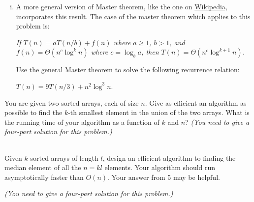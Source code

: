 \begin{qunlist}
\begin{enumerate}[(a)]
\begin{enumerate}[(i)]
\item A more general version of Master theorem, like the one on \href{https://en.wikipedia.org/wiki/Master_theorem}{Wikipedia}, incorporates this result. The case of the master theorem which applies to this problem is:

\textit{If $T(n) = aT(n/b) + f(n)$ where $a \geq 1$, $b > 1$, and $f(n) = \Theta(n^c \log^k n)$ where $c = \log_b a$, then $T(n) = \Theta(n^c \log^{k+1} n)$. }

Use the general Master theorem to solve the following recurrence relation:

$T(n) = 9T(n/3) + n^2 \log ^3 n$.
\end{enumerate} 
\end{enumerate}

\answer{}


You are given two sorted arrays, each of size $n$. Give as efficient an algorithm as possible to find the $k$-th smallest element in the union of the two arrays. What is the running time of your algorithm as a function of $k$ and $n$?
{\em (You need to give a four-part solution for this problem.)}

\answer{}


 \\
Given $k$ sorted arrays of length $l$, design an efficient algorithm to finding the median element of all the $n=kl$ elements. Your algorithm should run  asymptotically faster than $O(n)$. Your answer from 5 may be helpful.

{\em (You need to give a four-part solution for this problem.)}

\answer{}


\end{qunlist}
